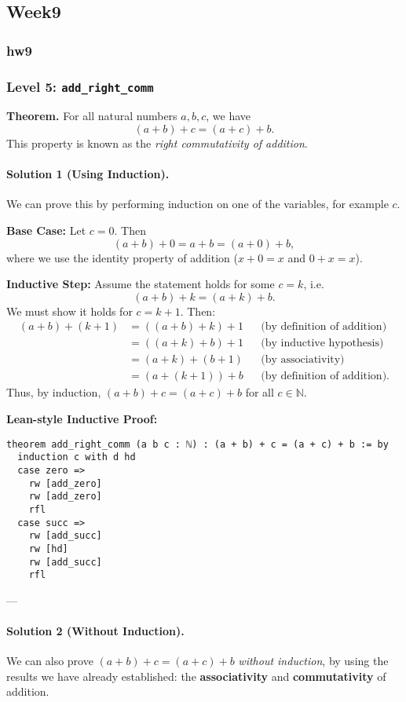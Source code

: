 \documentclass{article}
\theoremstyle{theorem}
\theoremstyle{definition}
\theoremstyle{remark}
\begin{document}
\subsection{Week9}
\subsubsection{hw9}
\subsubsection*{Level 5: \texttt{add\_right\_comm}}

\textbf{Theorem.} For all natural numbers $a, b, c$, we have
\[
(a + b) + c = (a + c) + b.
\]
This property is known as the \textit{right commutativity of addition}.

\paragraph{Solution 1 (Using Induction).}
We can prove this by performing induction on one of the variables, for example $c$.

\textbf{Base Case:} Let $c = 0$. Then
\[
(a + b) + 0 = a + b = (a + 0) + b,
\]
where we use the identity property of addition ($x + 0 = x$ and $0 + x = x$).

\textbf{Inductive Step:}  
Assume the statement holds for some $c = k$, i.e.
\[
(a + b) + k = (a + k) + b.
\]
We must show it holds for $c = k + 1$. Then:
\[
\begin{aligned}
(a + b) + (k + 1)
&= ((a + b) + k) + 1 && \text{(by definition of addition)}\\
&= ((a + k) + b) + 1 && \text{(by inductive hypothesis)}\\
&= (a + k) + (b + 1) && \text{(by associativity)}\\
&= (a + (k + 1)) + b && \text{(by definition of addition)}.
\end{aligned}
\]
Thus, by induction, $(a + b) + c = (a + c) + b$ for all $c \in \mathbb{N}$.

\textbf{Lean-style Inductive Proof:}
\begin{verbatim}
theorem add_right_comm (a b c : ℕ) : (a + b) + c = (a + c) + b := by
  induction c with d hd
  case zero =>
    rw [add_zero]
    rw [add_zero]
    rfl
  case succ =>
    rw [add_succ]
    rw [hd]
    rw [add_succ]
    rfl
\end{verbatim}

---

\paragraph{Solution 2 (Without Induction).}
We can also prove $(a + b) + c = (a + c) + b$ \textit{without induction}, by using the results we have already established: the \textbf{associativity} and \textbf{commutativity} of addition.
\end{document}
